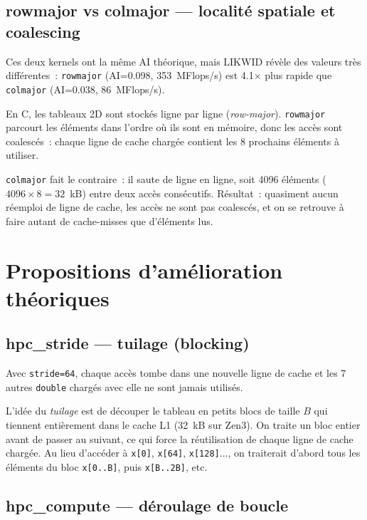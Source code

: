 \documentclass[a4paper,12pt]{article}
\begin{document}
\subsection{rowmajor vs colmajor — localité spatiale et coalescing}

Ces deux kernels ont la même AI théorique, mais LIKWID révèle des valeurs très différentes~:
\texttt{rowmajor} (AI=0.098, 353~MFlops/s) est 4.1× plus rapide que \texttt{colmajor}
(AI=0.038, 86~MFlops/s).

En C, les tableaux 2D sont stockés ligne par ligne (\textit{row-major}).
\texttt{rowmajor} parcourt les éléments dans l'ordre où ils sont en mémoire, donc les accès
sont coalescés~: chaque ligne de cache chargée contient les 8 prochains éléments à utiliser.

\texttt{colmajor} fait le contraire~: il saute de ligne en ligne, soit 4096 éléments
($4096 \times 8 = 32$~kB) entre deux accès consécutifs. Résultat~: quasiment aucun réemploi
de ligne de cache, les accès ne sont pas coalescés, et on se retrouve à faire autant de
cache-misses que d'éléments lus.

\newpage

\section{Propositions d'amélioration théoriques}

\subsection{hpc\_stride — tuilage (blocking)}

Avec \texttt{stride=64}, chaque accès tombe dans une nouvelle ligne de cache et les
7 autres \texttt{double} chargés avec elle ne sont jamais utilisés.

L'idée du \textit{tuilage} est de découper le tableau en petits blocs de taille $B$ qui
tiennent entièrement dans le cache L1 (32~kB sur Zen3). On traite un bloc entier avant de
passer au suivant, ce qui force la réutilisation de chaque ligne de cache chargée.
Au lieu d'accéder à \texttt{x[0]}, \texttt{x[64]}, \texttt{x[128]}..., on traiterait
d'abord tous les éléments du bloc \texttt{x[0..B]}, puis \texttt{x[B..2B]}, etc.

\subsection{hpc\_compute — déroulage de boucle}
\end{document}
